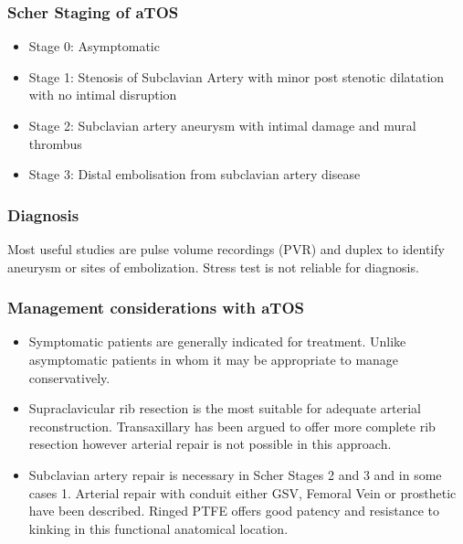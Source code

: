 \documentclass[
]{book}
\begin{document}
\hypertarget{scher-staging-of-atos}{%
\subsubsection{Scher Staging of aTOS}\label{scher-staging-of-atos}}

\begin{itemize}
\item
  Stage 0: Asymptomatic
\item
  Stage 1: Stenosis of Subclavian Artery with minor post stenotic
  dilatation with no intimal disruption
\item
  Stage 2: Subclavian artery aneurysm with intimal damage and mural
  thrombus
\item
  Stage 3: Distal embolisation from subclavian artery disease
\end{itemize}

\hypertarget{diagnosis}{%
\subsubsection{Diagnosis}\label{diagnosis}}

Most useful studies are pulse volume recordings (PVR) and duplex to
identify aneurysm or sites of embolization. Stress test is not reliable
for diagnosis. \citep{vemuriClinicalPresentationManagement2017, criadoSpectrumArterialCompression2010}

\hypertarget{management-considerations-with-atos}{%
\subsubsection{Management considerations with aTOS}\label{management-considerations-with-atos}}

\begin{itemize}
\item
  Symptomatic patients are generally indicated for treatment. Unlike
  asymptomatic patients in whom it may be appropriate to manage
  conservatively. \citep{boll122ThoracicOutlet2019}
\item
  Supraclavicular rib resection is the most suitable for adequate
  arterial reconstruction. Transaxillary has been argued to offer more
  complete rib resection however arterial repair is not possible in
  this approach.
\item
  Subclavian artery repair is necessary in Scher Stages 2 and 3 and in
  some cases 1. Arterial repair with conduit either GSV, Femoral Vein
  or prosthetic have been described. Ringed PTFE offers good patency
  and resistance to kinking in this functional anatomical location.~
\end{itemize}
\end{document}
